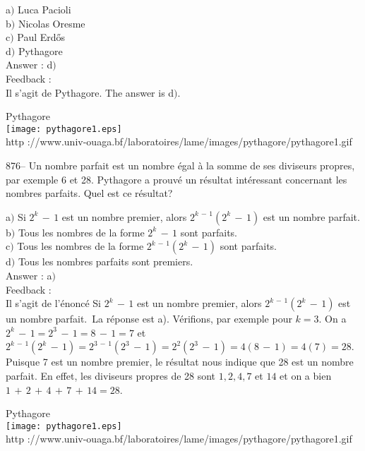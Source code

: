 ﻿\documentclass[letterpaper, 12pt]{article}
\begin{document}
a$)$ Luca Pacioli \\
b$)$ Nicolas Oresme \\
c$)$ Paul Erd\H{o}s \\
d$)$ Pythagore \\

Answer : d$)$\\

Feedback : \\
Il s'agit de Pythagore. The answer is d$)$.\\

        \begin{center}
        Pythagore\\
    \texttt{[image: pythagore1.eps]}\\
        {\footnotesize http
://www.univ-ouaga.bf/laboratoires/lame/images/pythagore/pythagore1.gif}
    \end{center}

876-- Un nombre parfait est un nombre \'egal \`a la somme de ses
diviseurs propres, par exemple 6 et 28. Pythagore a prouv\'e un
r\'esultat int\'eressant concernant les nombres parfaits. Quel est
ce r\'esultat?

a$)$ Si $2^k\,-\,1$ est un nombre premier, alors $2^{k\,-\,1}(2^k\,-\,1)$
est un nombre parfait. \\
b$)$ Tous les nombres de la forme $2^k\,-\,1$ sont parfaits. \\
c$)$ Tous les nombres de la forme $2^{k\,-\,1}(2^k\,-\,1)$ sont parfaits. \\
d$)$ Tous les nombres parfaits sont premiers.\\

Answer : a$)$\\

Feedback : \\
Il s'agit de l'\'enonc\'e \og Si $2^k\,-\,1$ est un nombre premier,
alors $2^{k\,-\,1}(2^k\,-\,1)$ est un nombre parfait.\fg\ La
r\'eponse est a). V\'erifions, par exemple pour $k=3$. On a
$2^k\,-\,1=2^3\,-\,1=8\,-\,1=7$ et
$2^{k\,-\,1}(2^k\,-\,1)=2^{3\,-\,1}(2^3\,-\,1)=2^2(2^3\,-\,1)=4(8\,-\,1)=4(7)=28$.
Puisque 7 est un nombre premier, le r\'esultat nous indique que 28
est un nombre parfait. En effet, les diviseurs propres de 28 sont
$1,2,4,7$ et $14$ et on a bien
$1\,+\,2\,+\,4\,+\,7\,+\,14=28$.\\

        \begin{center}
        Pythagore\\
    \texttt{[image: pythagore1.eps]}\\
        {\footnotesize http
://www.univ-ouaga.bf/laboratoires/lame/images/pythagore/pythagore1.gif}
    \end{center}
\end{document}
